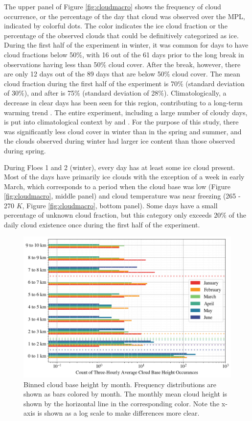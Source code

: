 The upper panel of Figure \ref{fig:cloudmacro} shows the frequency of cloud occurrence, or the percentage of the day that cloud was observed over the MPL, indicated by colorful dots. The color indicates the ice cloud fraction or the percentage of the observed clouds that could be definitively categorized as ice. During the first half of the experiment in winter, it was common for days to have cloud fractions below 50$\%$, with 16 out of the 61 days prior to the long break in observations having less than 50$\%$ cloud cover. After the break, however, there are only 12 days out of the 89 days that are below 50$\%$ cloud cover. The mean cloud fraction during the first half of the experiment is 70$\%$ (standard deviation of 30$\%$), and after is 75$\%$ (standard deviation of 28$\%$). Climatologically, a decrease in clear days has been seen for this region, contributing to a long-term warming trend \citep{kayser:2017}. The entire experiment, including a large number of cloudy days, is put into climatological context by \citet{graham:2017} and \citet{kayser:2017}. For the purpose of this study, there was significantly less cloud cover in winter than in the spring and summer, and the clouds observed during winter had larger ice content than those observed during spring.

During Floes 1 and 2 (winter), every day has at least some ice cloud present. Most of the days have primarily ice clouds with the exception of a week in early March, which corresponds to a period when the cloud base was low (Figure \ref{fig:cloudmacro}, middle panel) and cloud temperature was near freezing (265 - 270 $K$, Figure \ref{fig:cloudmacro}, bottom panel). Some days have a small percentage of unknown cloud fraction, but this category only exceeds 20$\%$ of the daily cloud existence once during the first half of the experiment. 

\begin{figure}[b!]
    \centering
    \includegraphics[width=1\linewidth]{figures/chapter4/CloudHeights.png}
    \caption[Cloud base height by month histogram.]{Binned cloud base height by month. Frequency distributions are shown as bars colored by month. The monthly mean cloud height is shown by the horizontal line in the corresponding color. Note the x-axis is shown as a log scale to make differences more clear.}
    \label{fig:cloudbase}
\end{figure}

